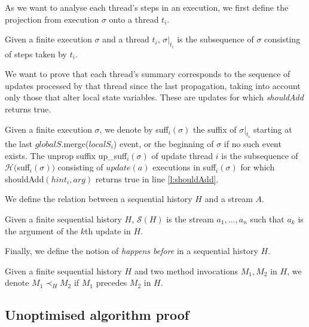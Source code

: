 As we want to analyse each thread's steps in an execution, we first define the projection from
execution $\sigma$ onto a thread $t_i$.
\begin{definition}[Projection]
    Given a finite execution $\sigma$ and a thread $t_i$, $\sigma\Bigr|_{t_i}$ is the subsequence of
    $\sigma$ consisting of steps taken by $t_i$.
\end{definition}

We want to prove that each thread's summary corresponds to the sequence of updates
processed by that thread since the last propagation, taking
into account only those that alter local state variables. These are updates for which \emph{shouldAdd} returns
true.
\begin{definition}
    Given a finite execution $\sigma$, we denote by suff$_i(\sigma)$ the suffix of $\sigma \Bigr|_{t_i}$ starting 
    at the last $globalS$.merge($localS_i$) event, or the beginning of $\sigma$ if no such event exists. 
    The unprop suffix up\_suff$_i(\sigma)$ of update thread $i$ is 
    the subsequence of $\mathcal{H} ($suff$_i(\sigma))$ consisting of $update(a)$ executions in suff$_i(\sigma)$ for which
    shouldAdd$(hint_i, arg)$ returns true in line \ref{l:shouldAdd}.
    \label{def:unpropogated-suffix}
\end{definition}

We define the relation between a sequential history $H$ and a stream $A$.
\begin{definition}
    Given a finite sequential history $H$, ${\mathcal{S}}(H)$ is the stream $a_1,\dots,a_n$ such that $a_k$
    is the argument of the $k$th update in $H$.
\end{definition}

Finally, we define the notion of \emph{happens before} in a sequential history $H$.
\begin{definition}
    Given a finite sequential history $H$ and two method invocations $M_1,M_2$ in $H$, we denote $M_1 \prec_H M_2$
    if $M_1$ precedes $M_2$ in $H$.
\end{definition}

\subsection{Unoptimised algorithm proof} 
\label{subsec:Generic-algorithm-proof}

